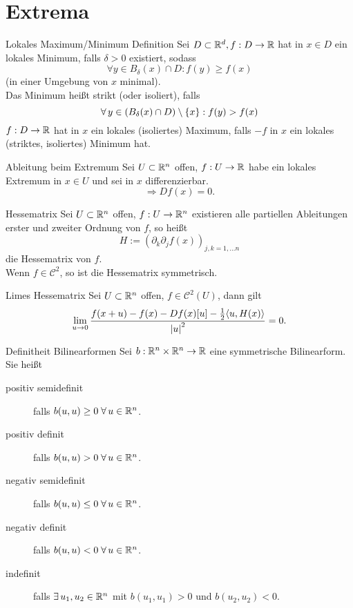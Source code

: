 \documentclass[main.tex]{subfiles}
\begin{document}
\section*{Extrema}

\begin{karte}{Lokales Maximum/Minimum Definition}
    Sei \(D \subset \mathbb{R}^d, f : D \rightarrow \mathbb{R}\) hat in \(x \in D\)
    ein lokales Minimum, falls \(\delta > 0\) existiert, sodass
    \[ \forall y \in B_\delta(x) \cap D: f(y) \geq f(x) \]
    (in einer Umgebung von \(x\) minimal). \\
    Das Minimum heißt strikt (oder isoliert), falls 
    \[ \forall y \in (B_\delta(x) \cap D) \setminus \set{x}: f(y) > f(x) \]
    \( f : D \rightarrow \mathbb{R} \) hat in \(x\) ein lokales (isoliertes) Maximum,
    falls \(-f\) in \(x\) ein lokales (striktes, isoliertes) Minimum hat.
\end{karte}

\begin{karte}{Ableitung beim Extremum}
    Sei \(U\subset \mathbb{R}^n\) offen, \(f : U \rightarrow \mathbb{R}\) habe ein lokales Extremum
    in \(x \in U\) und sei in \(x\) differenzierbar.
    \[ \Rightarrow Df(x) = 0. \]
\end{karte}

\begin{karte}{Hessematrix}
    Sei \( U \subset \mathbb{R}^n \) offen, 
    \( f : U \rightarrow \mathbb{R}^n \) existieren alle 
    partiellen Ableitungen erster und zweiter 
    Ordnung von \(f\), so heißt 
    \[ H := ( \partial_k \partial_j f(x) )_{j,k=1,\ldots n} \]
    die Hessematrix von \(f\).\\
    Wenn \(f \in \mathcal{C}^2\), so ist die Hessematrix 
    symmetrisch.
\end{karte}

\begin{karte}{Limes Hessematrix}
    Sei \(U \subset \mathbb{R}^n\) offen, \(f \in \mathcal{C}^2(U)\), 
    dann gilt
    \[ \lim\limits_{u\rightarrow 0} \frac{f(x+u) - f(x) - Df(x)[u] - \frac{1}{2} 
    \langle u, H(x) \rangle}{\left| u \right|^2} = 0. \]
\end{karte}

\begin{karte}{Definitheit Bilinearformen}
    Sei \( b : \mathbb{R}^n\times \mathbb{R}^n \rightarrow \mathbb{R} \) eine 
    symmetrische Bilinearform. Sie heißt 
    \begin{description}
        \item[positiv semidefinit] falls 
        \( b(u,u) \geq 0 \;\forall u\in \R^n \).
        \item[positiv definit] falls 
        \( b(u,u) > 0 \;\forall u\in \R^n \).
        \item[negativ semidefinit] falls 
        \( b(u,u) \leq 0 \;\forall u\in \R^n \).
        \item[negativ definit] falls 
        \( b(u,u) < 0 \;\forall u\in \R^n \).
        \item[indefinit] falls \( \exists u_1, u_2\in \R^n \) 
        mit \( b(u_1, u_1) > 0 \) und \( b(u_2, u_2) < 0 \).
    \end{description}
\end{karte}
\end{document}
